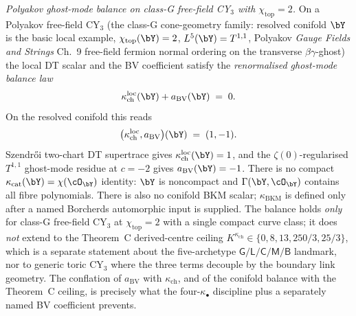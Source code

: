 \begin{remark}
\emph{Polyakov ghost-mode balance on class-G free-field CY$_3$ with
$\chi_{\mathrm{top}}=2$.} On a Polyakov free-field CY$_3$ (the
class-G cone-geometry family: resolved conifold $\bY$ is the
basic local example, $\chi_{\mathrm{top}}(\bY)=2$,
$L^5(\bY)=T^{1,1}$, Polyakov \emph{Gauge Fields and Strings} Ch.~9
free-field fermion normal ordering on the transverse
$\beta\gamma$-ghost) the local DT scalar and the BV coefficient
satisfy the \emph{renormalised ghost-mode balance law}
\[
 \kappa_{\mathrm{ch}}^{\mathrm{loc}}(\bY) + a_{\mathrm{BV}}(\bY)
 \;=\; 0.
\]
On the resolved conifold this reads
\[
 \bigl(\kappa_{\mathrm{ch}}^{\mathrm{loc}},a_{\mathrm{BV}}\bigr)(\bY)
 \;=\; (1,-1).
\]
Szendr\H{o}i two-chart DT supertrace gives
$\kappa_{\mathrm{ch}}^{\mathrm{loc}}(\bY)=1$, and the
$\zeta(0)$-regularised $T^{1,1}$ ghost-mode residue at $c=-2$
gives $a_{\mathrm{BV}}(\bY)=-1$. There is no compact
$\kappa_{\mathrm{cat}}(\bY)=\chi(\cO_{\bY})$ identity: $\bY$ is
noncompact and $\Gamma(\bY,\cO_{\bY})$ contains all fibre polynomials.
There is also no conifold BKM scalar; $\kappa_{\mathrm{BKM}}$ is defined
only after a named Borcherds automorphic input is supplied. The balance holds
\emph{only} for class-G free-field CY$_3$ at
$\chi_{\mathrm{top}}=2$ with a single compact curve class; it does
\emph{not} extend to the Theorem~C derived-centre ceiling
$K^{\kappa_{\mathrm{ch}}}\in\{0,8,13,250/3,25/3\}$, which is a separate statement
about the five-archetype
$\mathsf{G}/\mathsf{L}/\mathsf{C}/\mathsf{M}/\mathsf{B}$ landmark,
nor to generic toric CY$_3$ where the three terms decouple by the
boundary link geometry. The conflation of
$a_{\mathrm{BV}}$ with $\kappa_{\mathrm{ch}}$, and of the
conifold balance with the Theorem~C ceiling, is precisely what
the four-$\kappa_\bullet$ discipline plus a separately named BV coefficient
prevents.
\end{remark}

